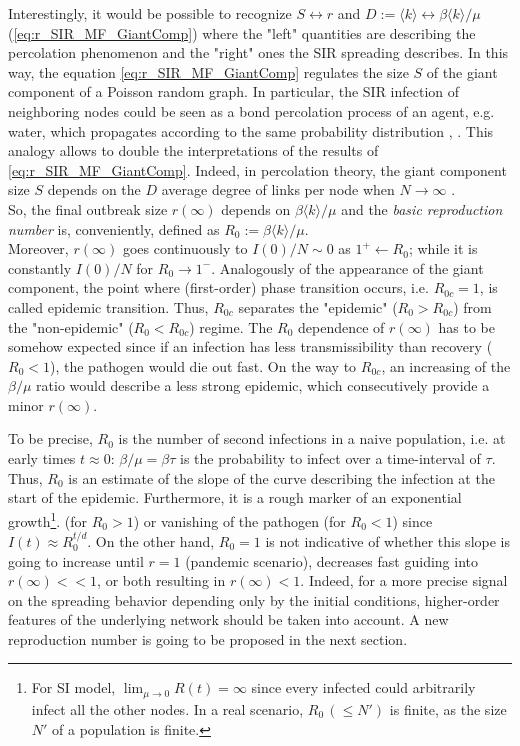 \documentclass[a4paper,10pt,twoside]{book} %
\theoremstyle{definition}
\begin{document}
Interestingly, it would be possible to recognize $S \leftrightarrow r$ and $D:= \langle k \rangle \leftrightarrow \beta \langle k \rangle/\mu$ (\autoref{eq:r_SIR_MF_GiantComp}) where the "left" quantities are describing the percolation phenomenon and the "right" ones the SIR spreading describes. In this way, the equation \autoref{eq:r_SIR_MF_GiantComp} regulates the size $S$ of the giant component of a Poisson random graph. In particular, the SIR infection of neighboring nodes could be seen as a bond percolation process of an agent, e.g. water, which propagates according to the same probability distribution \cite{Newman:2010_Net:AnIntro}, \cite{barabasi::2016networkbook}. 
This analogy allows to double the interpretations of the results of \autoref{eq:r_SIR_MF_GiantComp}.
Indeed, in percolation theory, the giant component size $S$ depends on the $D$ average degree of links per node when $N \to \infty$ . 
\\So, the final outbreak size $r(\infty)$ depends on $\beta \langle k \rangle / \mu$ and the \textit{basic reproduction number} is, conveniently, defined as $R_0 := \beta \langle k \rangle / \mu$. 
\\Moreover, $r(\infty)$ goes continuously to $I(0)/N \sim 0$ as $1^{+} \leftarrow R_0$; while it is constantly $I(0)/N$ for $R_0 \to 1^{-}$. Analogously of the appearance of the giant component, the point where (first-order) phase transition occurs, i.e. $R_{0c} = 1$, is called epidemic transition. Thus, $R_{0c}$ separates the "epidemic" ($R_0 > R_{0c}$) from the "non-epidemic" ($R_0 < R_{0c}$) regime.
The $R_0$ dependence of $r(\infty)$ has to be somehow expected since if an infection has less transmissibility than recovery ($R_0 <1$), the pathogen would die out fast. On the way to $R_{0c}$, an increasing of the $\beta / \mu$ ratio would describe a less strong epidemic, which consecutively provide a minor $r(\infty)$.

To be precise, $R_0$ is the number of second infections in a naive population, i.e. at early times $t \approx 0$: $\beta/\mu = \beta \tau$ is the probability to infect over a time-interval of $\tau$. Thus, $R_0$ is an estimate of the slope of the curve describing the infection at the start of the epidemic. Furthermore, it is a rough marker of an exponential growth\footnote{For SI model, $\lim_{\mu \to 0} R(t) = \infty$ since every infected could arbitrarily infect all the other nodes. In a real scenario, $R_0 \, (\leq N')$ is finite, as the size $N'$ of a population is finite.}. (for $R_0 > 1$) or vanishing of the pathogen (for $R_0 < 1$) since $I(t) \approx R_0^{t/d}$. On the other hand, $R_0 =1$ is not indicative of whether this slope is going to increase until $r=1$ (pandemic scenario), decreases fast guiding into $r(\infty)<<1$, or both resulting in $r(\infty)<1$. Indeed, for a more precise signal on the spreading behavior depending only by the initial conditions, higher-order features of the underlying network should be taken into account. A new reproduction number is going to be proposed in the next section.
\end{document}
